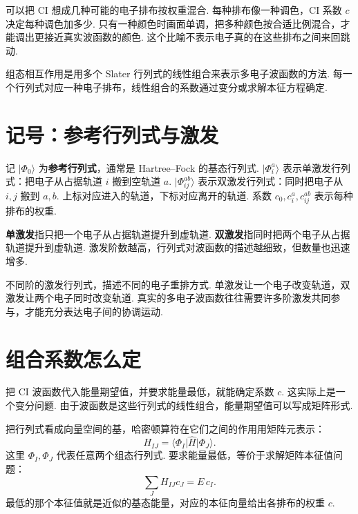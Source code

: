 \documentclass[UTF8,11pt,a4paper,openany]{ctexbook}
\newcommand{\ket}[1]{\lvert #1\rangle}\newcommand{\bra}[1]{\langle #1\rvert}
\newcommand{\term}[1]{\textbf{#1}}
\begin{document}
\begin{analogybox}
可以把 CI 想成几种可能的电子排布按权重混合. 每种排布像一种调色，CI 系数 $c$ 决定每种调色加多少. 只有一种颜色时画面单调，把多种颜色按合适比例混合，才能调出更接近真实波函数的颜色. 这个比喻不表示电子真的在这些排布之间来回跳动. 
\end{analogybox}

\begin{definitionbox}
组态相互作用是用多个 Slater 行列式的线性组合来表示多电子波函数的方法. 每一个行列式对应一种电子排布，线性组合的系数通过变分或求解本征方程确定. 
\end{definitionbox}

\section{记号：参考行列式与激发}

\begin{notationbox}
记 $\ket{\Phi_0}$ 为\term{参考行列式}，通常是 Hartree--Fock 的基态行列式. $\ket{\Phi_i^a}$ 表示单激发行列式：把电子从占据轨道 $i$ 搬到空轨道 $a$. $\ket{\Phi_{ij}^{ab}}$ 表示双激发行列式：同时把电子从 $i,j$ 搬到 $a,b$. 上标对应进入的轨道，下标对应离开的轨道. 系数 $c_0,c_i^a,c_{ij}^{ab}$ 表示每种排布的权重. 
\end{notationbox}

\begin{definitionbox}
\term{单激发}指只把一个电子从占据轨道提升到虚轨道. \term{双激发}指同时把两个电子从占据轨道提升到虚轨道. 激发阶数越高，行列式对波函数的描述越细致，但数量也迅速增多. 
\end{definitionbox}

不同阶的激发行列式，描述不同的电子重排方式. 单激发让一个电子改变轨道，双激发让两个电子同时改变轨道. 真实的多电子波函数往往需要许多阶激发共同参与，才能充分表达电子间的协调运动. 

\section{组合系数怎么定}

把 CI 波函数代入能量期望值，并要求能量最低，就能确定系数 $c$. 这实际上是一个变分问题. 由于波函数是这些行列式的线性组合，能量期望值可以写成矩阵形式. 

把行列式看成向量空间的基，哈密顿算符在它们之间的作用用矩阵元表示：
\[
H_{IJ}=\bra{\Phi_I}\hat H\ket{\Phi_J}.
\]
这里 $\Phi_I,\Phi_J$ 代表任意两个组态行列式. 要求能量最低，等价于求解矩阵本征值问题：
\[
\sum_JH_{IJ}c_J=E\,c_I.
\]
最低的那个本征值就是近似的基态能量，对应的本征向量给出各排布的权重 $c$. 
\end{document}

